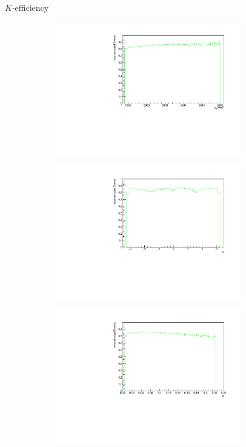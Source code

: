 \documentclass[11pt]{beamer}
\begin{document}
\begin{frame}{$K$-efficiency}
\begin{figure}
\begin{subfigure}{0.45\textwidth}
\includegraphics[width=0.9\textwidth]{up_pdf/single/tot/h_pt_reco_K.pdf}
\end{subfigure}
\begin{subfigure}{0.45\textwidth}
\includegraphics[width=0.9\textwidth]{up_pdf/single/tot/h_phi_reco_K.pdf}
\end{subfigure}
\begin{subfigure}{0.45\textwidth}
\includegraphics[width=0.9\textwidth]{up_pdf/single/tot/h_theta_reco_K.pdf}

\end{subfigure}
\end{figure}
\end{frame}
\end{document}
